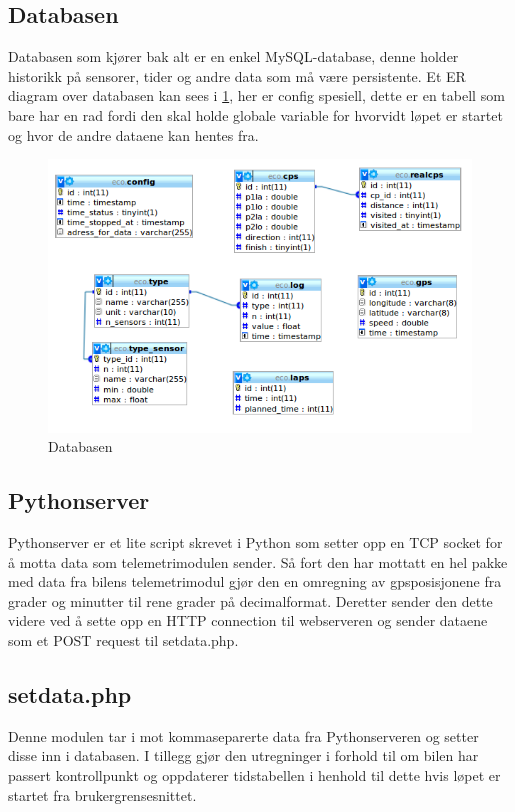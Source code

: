 \subsection{Databasen}
Databasen som kjører bak alt er en enkel MySQL-database, denne holder historikk på sensorer, tider og andre data som må være persistente. Et ER diagram over databasen kan sees i \ref{er}, her er config spesiell, dette er en tabell som bare har en rad fordi den skal holde globale variable for hvorvidt løpet er startet og hvor de andre dataene kan hentes fra.
\begin{figure}[H]
\caption{Databasen} 
\label{er}
\includegraphics[width=\textwidth]{images/er.png}
\end{figure}

\subsection{Pythonserver}
Pythonserver er et lite script skrevet i Python som setter opp en TCP socket for å motta data som telemetrimodulen sender. Så fort den har mottatt en hel pakke med data fra bilens telemetrimodul gjør den en omregning av gpsposisjonene fra grader og minutter til rene grader på decimalformat. Deretter sender den dette videre ved å sette opp en HTTP connection til webserveren og sender dataene som et POST request til setdata.php.
\subsection{setdata.php}
Denne modulen tar i mot kommaseparerte data fra Pythonserveren og setter disse inn i databasen. I tillegg gjør den utregninger i forhold til om bilen har passert kontrollpunkt og oppdaterer tidstabellen i henhold til dette hvis løpet er startet fra brukergrensesnittet.
